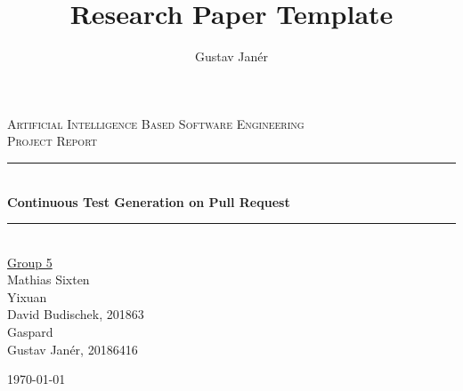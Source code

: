 \documentclass[12pt, a4paper]{article}
\title{Research Paper Template} %
\author{Gustav Janér}  %
\newcommand{\HRule}{\rule{\linewidth}{0.5mm}} %
\begin{document}
\begin{titlepage} 
\center 	     %


\textsc{\LARGE Artificial Intelligence Based Software Engineering} \\[1cm]

\textsc{\Large Project Report}\\[0.5cm]


\HRule \\[0.4cm]
{ \huge \bfseries Continuous Test Generation on Pull Request}\\[0.03cm] %
\HRule \\[1.5cm]
 

{\Large \underline{Group 5} \\
Mathias Sixten \\
Yixuan  \\
David Budischek, 201863  \\
Gaspard \\
Gustav Janér, 20186416 \\
} %

\vspace{0.3cm}
\today
\vspace{4cm}



\end{titlepage}
\end{document}
